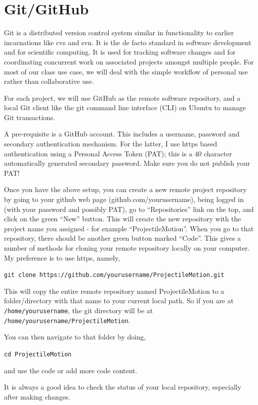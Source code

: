 \section{Git/GitHub}\label{sec:1}

Git is a distributed version control system similar 
in functionality to earlier incarnations like cvs and svn. It is 
the de facto standard in software development 
and for scientific computing. It is used for tracking software 
changes and for coordinating concurrent work 
on associated projects amongst multiple people. 
For most of our class use case, we will deal with the 
simple workflow of personal use rather than collaborative use.

For each project, we will use GitHub as 
the remote software repository, and a 
local Git client like the git command line interface (CLI) 
on Ubuntu to manage Git transactions.

A pre-requisite is a GitHub account. 
This includes a username, password 
and secondary authentication mechanism.
For the latter, I use https based authentication using 
a Personal Access Token (PAT); this is a 40 character 
automatically generated secondary password. 
Make sure you do not publish your PAT!

Once you have the above setup, you can create 
a new remote project repository by going to your github web page 
(github.com/yourusername), being logged in (with your password and possibly PAT), go 
to ``Repositories'' link on the top, and 
click on the green ``New'' button. This will create 
the new repository with the project name 
you assigned - for example ``ProjectileMotion''. When 
you go to that repository, there should be another green 
button marked ``Code''. This gives a number of methods for cloning your 
remote repository locally on your computer.
My preference is to use https, namely,

\texttt{git clone https://github.com/yourusername/ProjectileMotion.git}

This will copy the entire remote repository named ProjectileMotion to 
a folder/directory with that name to your current local path. 
So if you are at \texttt{/home/yourusername}, the git directory 
will be at \texttt{/home/yourusername/ProjectileMotion}.

You can then navigate to that folder by doing, 

\texttt{cd ProjectileMotion}

and use the code or add more code content.

It is always a good idea to check the status of your local repository, especially 
after making changes.

